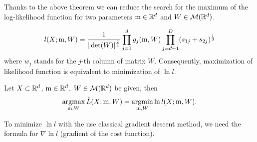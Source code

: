 Thanks to the above theorem we can reduce the search for the maximum of the log-likelihood function for two parameters $\mathrm{m} \in \mathbb{R}^d$ and $W \in \mathcal{M}(\mathbb{R}^d)$.

\begin{equation}\label{equ:ll}
{l}(X;\mathrm{m},W) = \frac{1}{|\det(W)|^{\frac{2}{3}}} \prod_{j=1}^{d} {g}_{j}(\mathrm{m},W) \prod_{j=d+1}^{D} (s_{1j} + s_{2j})^{\frac{1}{3}}
\end{equation}
where $w_{j}$ stands for the $j$-th column of matrix $W$. 
Consequently, maximization of likelihood function is equivalent to minimization of  $\ln l$.

\begin{corollary}\label{c2}
Let $X \subset \mathbb{R}^d$, $\mathrm{m} \in \mathbb{R}^d$, $W \in \mathcal{M}(\mathbb{R}^d)$ be given, then
$$
\operatorname*{argmax}_{\mathrm{m},W} \hat{L}(X;\mathrm{m},W) =  \operatorname*{argmin}_{\mathrm{m},W} \ln {l}(X;\mathrm{m},W).
$$
\end{corollary}


To minimize $\ln l$ with the use classical gradient descent method, we need
the formula for $\nabla \ln l$ (gradient of the cost function). 



